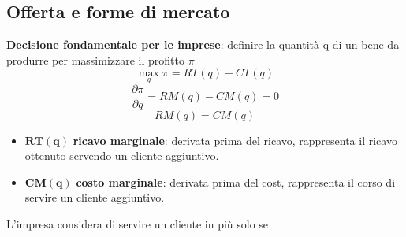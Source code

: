 \documentclass[../main.tex]{subfiles}
\begin{document}
\subsection{Offerta e forme di mercato}

\textbf{Decisione fondamentale per le imprese}: definire la quantità q di un bene da produrre per massimizzare il profitto $\pi$
$$\max_q \pi = RT(q) - CT(q)$$
$$\frac{\partial \pi}{\partial q}=RM(q) - CM(q) = 0$$
$$RM(q) = CM(q)$$
\begin{itemize}
\item $\mathbf{RT(q)}$ \textbf{ricavo marginale}: derivata prima del ricavo, rappresenta il ricavo ottenuto servendo un cliente aggiuntivo.
\item $\mathbf{CM(q)}$ \textbf{costo marginale}: derivata prima del cost, rappresenta il corso di servire un cliente aggiuntivo.
\end{itemize}

L'impresa considera di servire un cliente in più solo se 
\end{document}
